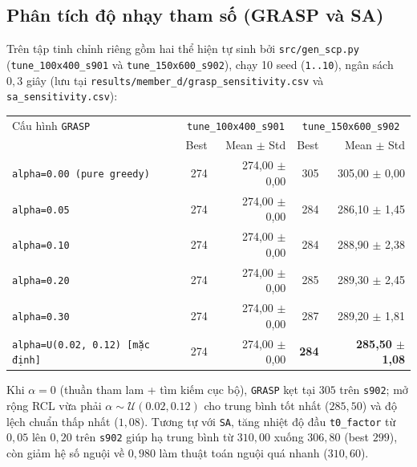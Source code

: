 \subsection{Phân tích độ nhạy tham số (GRASP và SA)}
Trên tập tinh chỉnh riêng gồm hai thể hiện tự sinh bởi \texttt{src/gen\_scp.py} (\texttt{tune\_100x400\_s901} và \texttt{tune\_150x600\_s902}), chạy 10 seed (\texttt{1..10}), ngân sách $0{,}3$ giây (lưu tại \texttt{results/member\_d/grasp\_sensitivity.csv} và \texttt{sa\_sensitivity.csv}):
\begin{center}
\small
\begin{tabular}{lrrrr}
\toprule
Cấu hình \texttt{GRASP} & \multicolumn{2}{c}{\texttt{tune\_100x400\_s901}} & \multicolumn{2}{c}{\texttt{tune\_150x600\_s902}} \\
 & Best & Mean $\pm$ Std & Best & Mean $\pm$ Std \\
\midrule
\texttt{alpha=0.00 (pure greedy)} & 274 & 274,00 $\pm$ 0,00 & 305 & 305,00 $\pm$ 0,00 \\
\texttt{alpha=0.05} & 274 & 274,00 $\pm$ 0,00 & 284 & 286,10 $\pm$ 1,45 \\
\texttt{alpha=0.10} & 274 & 274,00 $\pm$ 0,00 & 284 & 288,90 $\pm$ 2,38 \\
\texttt{alpha=0.20} & 274 & 274,00 $\pm$ 0,00 & 285 & 289,30 $\pm$ 2,45 \\
\texttt{alpha=0.30} & 274 & 274,00 $\pm$ 0,00 & 287 & 289,20 $\pm$ 1,81 \\
\texttt{alpha=U(0.02, 0.12) [mặc định]} & 274 & 274,00 $\pm$ 0,00 & \textbf{284} & \textbf{285,50 $\pm$ 1,08} \\
\bottomrule
\end{tabular}
\end{center}
Khi $\alpha = 0$ (thuần tham lam + tìm kiếm cục bộ), \texttt{GRASP} kẹt tại $305$ trên \texttt{s902}; mở rộng RCL vừa phải $\alpha \sim \mathcal{U}(0.02, 0.12)$ cho trung bình tốt nhất ($285{,}50$) và độ lệch chuẩn thấp nhất ($1{,}08$). Tương tự với \texttt{SA}, tăng nhiệt độ đầu \texttt{t0\_factor} từ $0{,}05$ lên $0{,}20$ trên \texttt{s902} giúp hạ trung bình từ $310{,}00$ xuống $306{,}80$ (best $299$), còn giảm hệ số nguội về $0{,}980$ làm thuật toán nguội quá nhanh ($310{,}60$).

